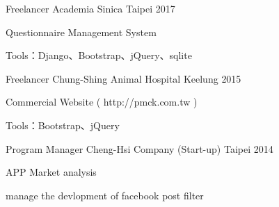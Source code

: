 

\begin{cventries}

  \cventry
    {Freelancer} %
    {Academia Sinica} %
    {Taipei} %
    {2017} %
    {
      \begin{cvitems} %
        \item {Questionnaire Management System}
        \item {Tools：Django、Bootstrap、jQuery、sqlite}
      \end{cvitems}
    }

  \cventry
    {Freelancer} %
    {Chung-Shing Animal Hospital} %
    {Keelung} %
    {2015} %
    {
      \begin{cvitems} %
      \item {Commercial Website ( http://pmck.com.tw )}
        \item {Tools：Bootstrap、jQuery}
      \end{cvitems}
    }

  \cventry
    {Program Manager} %
    {Cheng-Hsi Company (Start-up)} %
    {Taipei} %
    {2014} %
    {
      \begin{cvitems} %
        \item {APP Market analysis}
        \item {manage the devlopment of facebook post filter}
      \end{cvitems}
    }

\end{cventries}
